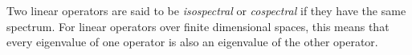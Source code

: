 \documentclass[12pt]{article}
\begin{document}
Two linear operators are said to be \emph{isospectral} or \emph{cospectral} if they have the same spectrum.  For linear operators over finite dimensional spaces, this means that every eigenvalue of one operator is also an eigenvalue of the other operator.
\end{document}
